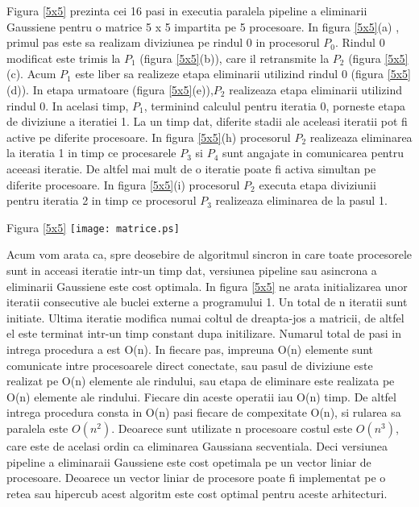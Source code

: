 Figura \ref{5x5} prezinta cei 16 pasi in executia paralela pipeline a
eliminarii Gaussiene pentru o matrice 5 x 5 impartita pe 5 procesoare. In
figura \ref{5x5}(a) , primul pas este sa realizam diviziunea pe rindul
0 in procesorul $P_0$. Rindul 0 modificat este trimis la $P_1$ (figura 
\ref{5x5}(b)), care il retransmite la $P_2$ (figura \ref{5x5}(c). Acum $P_1$
este liber sa realizeze etapa eliminarii utilizind rindul 0 (figura
\ref{5x5}(d)). In etapa urmatoare (figura \ref{5x5}(e)),$P_2$ realizeaza
etapa eliminarii utilizind rindul 0. In acelasi timp, $P_1$, terminind
calculul pentru iteratia 0, porneste etapa de diviziune a iteratiei 1. La un
timp dat, diferite stadii ale aceleasi iteratii pot fi active pe diferite
procesoare. In figura \ref{5x5}(h) procesorul $P_2$ realizeaza eliminarea la
iteratia 1 in timp ce procesarele $P_3$ si $P_4$ sunt angajate in
comunicarea pentru aceeasi iteratie. De altfel mai mult de o iteratie poate
fi activa simultan pe diferite procesoare. In figura \ref{5x5}(i)
procesorul $P_2$ executa etapa diviziunii pentru iteratia 2 in timp ce
procesorul $P_3$ realizeaza eliminarea de la pasul 1.

\vspace*{5mm}
\label{5x5}
\hspace{20mm}Figura \ref{5x5}
\texttt{[image: matrice.ps]}
\vspace*{5mm}

Acum vom arata ca, spre deosebire de algoritmul sincron in care toate
procesorele sunt in acceasi iteratie intr-un timp dat, versiunea pipeline
sau asincrona a eliminarii Gaussiene este cost optimala. In figura \ref{5x5}
ne arata initializarea unor iteratii consecutive ale buclei externe a
programului 1. Un total de n iteratii sunt initiate. 
Ultima iteratie modifica numai coltul de dreapta-jos
a matricii, de altfel el este terminat intr-un timp constant dupa
initilizare. Numarul total de pasi in intrega procedura a est O(n). In
fiecare pas, impreuna O(n) elemente sunt comunicate intre procesoarele direct
conectate, sau pasul de diviziune este realizat pe O(n) elemente ale
rindului, sau etapa de eliminare este realizata pe O(n) elemente ale
rindului. Fiecare din aceste operatii iau O(n) timp. De altfel intrega
procedura consta in O(n) pasi fiecare de compexitate O(n), si rularea sa
paralela este $O(n^2)$. Deoarece sunt utilizate n procesoare costul este
$O(n^3)$, care este de acelasi ordin ca eliminarea Gaussiana secventiala.
Deci  versiunea pipeline a eliminaraii Gaussiene este cost opetimala pe un
vector liniar de procesoare. Deoarece un vector liniar de procesore poate fi
implementat pe o retea sau hipercub acest algoritm este cost optimal pentru
aceste arhitecturi.


